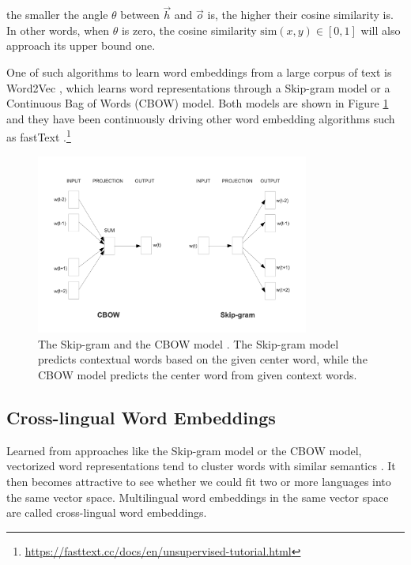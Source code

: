 \documentclass[thesis,fonts=libertine]{cluu}
\begin{document}
\noindent the smaller the angle $\theta$ between $\vec{h}$ and $\vec{o}$ is, the higher their cosine similarity is. In other words, when $\theta$ is zero, the cosine similarity $\text{sim}(x, y) \in [0, 1]$ will also approach its upper bound one.

 One of such algorithms to learn word embeddings from a large corpus of text is Word2Vec \parencite{Mikolov:2013aa,Mikolov:2013ab}, which learns word representations through a Skip-gram model or a Continuous Bag of Words (CBOW) model. Both models are shown in Figure \ref{fig:skip_gram_and_cbow} and they have been continuously driving other word embedding algorithms such as fastText \parencite{Joulin:2018aa}.\footnote{\url{https://fasttext.cc/docs/en/unsupervised-tutorial.html}}

\begin{figure}
  \centering
  \includegraphics[width=0.8\textwidth]{skip_gram_and_cbow_models.png}
  \caption{The Skip-gram and the CBOW model \parencite{Mikolov:2013ac}. The Skip-gram model predicts contextual words based on the given center word, while the CBOW model predicts the center word from given context words.}
  \label{fig:skip_gram_and_cbow}
\end{figure}

\subsection{Cross-lingual Word Embeddings}
\label{sec:multilingual_word_embeddings}

Learned from approaches like the Skip-gram model or the CBOW model, vectorized word representations tend to cluster words with similar semantics \parencite{Mikolov:2013ac}. It then becomes attractive to see whether we could fit two or more languages into the same vector space. Multilingual word embeddings in the same vector space are called cross-lingual word embeddings.
\end{document}
